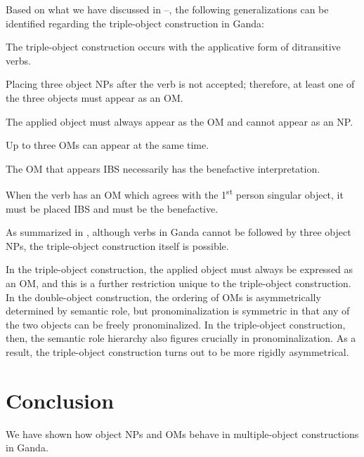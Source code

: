 \documentclass[output=paper,
            colorlinks, citecolor=brown
            ,draftmode
		  ]{langscibook}
\begin{document}
Based on what we have discussed in --, the following generalizations can be identified  regarding the triple-object construction in Ganda: 

\ea%
    \label{ex:yoneda:57}
    \ea\label{ex:yoneda:57a}    The triple-object construction occurs with the applicative form of ditransitive verbs.

    \ex\label{ex:yoneda:57b}    Placing three object NPs after the verb is not accepted; therefore, at least one of the three objects must appear as an OM.  

    \ex\label{ex:yoneda:57c}    The applied object must always appear as the OM and cannot appear as an NP.

    \ex\label{ex:yoneda:57d}    Up to three OMs can appear at the same time. 

    \ex\label{ex:yoneda:57e}    The OM that appears IBS necessarily has the benefactive interpretation. 

    \ex\label{ex:yoneda:57f}    When the verb has an OM which agrees with the 1\textsuperscript{st} person singular object, it must be placed IBS and must be the benefactive.   
    \z
\z

As summarized in , although verbs in Ganda cannot be followed by three object NPs, the triple-object construction itself is possible. 

    In the triple-object construction, the applied object must always be expressed as an OM, and this is a further restriction unique to the triple-object construction. In the double-object construction, the ordering of OMs is asymmetrically determined by semantic role, but pronominalization is symmetric in that any of the two objects can be freely pronominalized. In the triple-object construction, then, the semantic role hierarchy also figures crucially in pronominalization. As a result, the triple-object construction turns out to be more rigidly asymmetrical.


\section{Conclusion}
\label{sec:yoneda:5}


We have shown how object NPs and OMs behave in multiple-object constructions in Ganda. 
\end{document}
